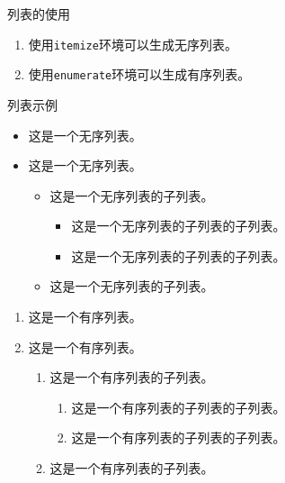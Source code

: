 \documentclass[8pt]{ctexbeamer}
\begin{document}
\begin{frame}{\insertsection}{\insertsubsection}

    \begin{block}{列表的使用}
        \begin{enumerate}
            \item 使用\lstinline|itemize|环境可以生成无序列表。
            \item 使用\lstinline|enumerate|环境可以生成有序列表。
        \end{enumerate}
    \end{block}

    \begin{block}{列表示例}

        \begin{itemize}
            \item 这是一个无序列表。
            \item 这是一个无序列表。
            \begin{itemize}
                \item 这是一个无序列表的子列表。
                \begin{itemize}
                    \item 这是一个无序列表的子列表的子列表。
                    \item 这是一个无序列表的子列表的子列表。
                \end{itemize}
                \item 这是一个无序列表的子列表。
            \end{itemize}
        \end{itemize}

        \begin{enumerate}
            \item 这是一个有序列表。
            \item 这是一个有序列表。
            \begin{enumerate}
                \item 这是一个有序列表的子列表。
                \begin{enumerate}
                    \item 这是一个有序列表的子列表的子列表。
                    \item 这是一个有序列表的子列表的子列表。
                \end{enumerate}
                \item 这是一个有序列表的子列表。
            \end{enumerate}
        \end{enumerate}


    \end{block}

\end{frame}
\end{document}
